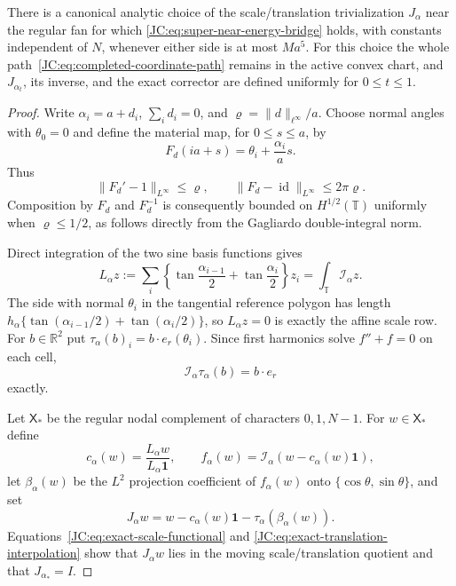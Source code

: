 \begin{proposition}
\label{JC:prop:super-near-bridge-active}
There is a canonical analytic choice of the scale/translation
trivialization $J_\alpha$ near the regular fan for which
\eqref{JC:eq:super-near-energy-bridge} holds, with constants independent of
$N$, whenever either side is at most $Ma^5$.  For this choice the whole
path~\eqref{JC:eq:completed-coordinate-path} remains in the active convex
chart, and $J_{\alpha_t}$, its inverse, and the exact corrector are defined
uniformly for $0\le t\le1$.
\end{proposition}

\begin{proof}
Write $\alpha_i=a+d_i$, $\sum_i d_i=0$, and
\(\varrho=\|d\|_{\ell^\infty}/a\).  Choose normal angles with
$\theta_0=0$ and define the material map, for $0\le s\le a$, by
\[
 F_d(ia+s)=\theta_i+\frac{\alpha_i}{a}s .
\]
Thus
\begin{equation}\label{JC:eq:material-map-small}
 \|F_d'-1\|_{L^\infty}\le\varrho,
 \qquad
 \|F_d-\operatorname{id}\|_{L^\infty}\le2\pi\varrho .
\end{equation}
Composition by $F_d$ and $F_d^{-1}$ is consequently bounded on
$H^{1/2}(\mathbb T)$ uniformly when $\varrho\le1/2$, as follows directly
from the Gagliardo double-integral norm.

Direct integration of the two sine basis functions gives
\begin{equation}\label{JC:eq:exact-scale-functional}
 L_\alpha z:=\sum_i\left\{
 \tan\frac{\alpha_{i-1}}2+\tan\frac{\alpha_i}2\right\}z_i
 =\int_{\mathbb T}\mathcal I_\alpha z .
\end{equation}
The side with normal $\theta_i$ in the tangential reference polygon has
length $h_\alpha\{\tan(\alpha_{i-1}/2)+\tan(\alpha_i/2)\}$, so
$L_\alpha z=0$ is exactly the affine scale row.  For $b\in\mathbb R^2$
put $\tau_\alpha(b)_i=b\cdot e_r(\theta_i)$.  Since first harmonics solve
$f''+f=0$ on each cell,
\begin{equation}\label{JC:eq:exact-translation-interpolation}
 \mathcal I_\alpha\tau_\alpha(b)=b\cdot e_r
\end{equation}
exactly.

Let $\mathsf X_*$ be the regular nodal complement of characters
$0,1,N-1$.  For $w\in\mathsf X_*$ define
\[
 c_\alpha(w)=\frac{L_\alpha w}{L_\alpha\mathbf1},
 \qquad
 f_\alpha(w)=\mathcal I_\alpha(w-c_\alpha(w)\mathbf1),
\]
let $\beta_\alpha(w)$ be the $L^2$ projection coefficient of $f_\alpha(w)$
onto $\{\cos\theta,\sin\theta\}$, and set
\begin{equation}\label{JC:eq:canonical-Jalpha}
 J_\alpha w=w-c_\alpha(w)\mathbf1-\tau_\alpha(\beta_\alpha(w)).
\end{equation}
Equations~\eqref{JC:eq:exact-scale-functional} and
\eqref{JC:eq:exact-translation-interpolation} show that $J_\alpha w$ lies
in the moving scale/translation quotient and that $J_{\alpha_*}=I$.


\end{proof}
